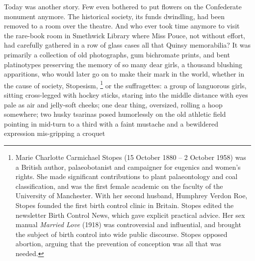   Today was another story. Few even bothered to put flowers on the Confederate
monument anymore. The historical society, its funds dwindling, had been removed
to a room over the theatre. And who ever took time anymore to visit the
rare-book room in Smethwick Library where Miss Pouce, not without effort, had
carefully gathered in a row of glass cases all that Quinsy memorabilia? It was
primarily a collection of old photographs, gum bichromate 
prints, and bent platinotypes 
preserving the memory of so many dear girls, a thousand blushing apparitions, 
who would later go on to make their mark in the world, whether in
the cause of society, Stopesism, 
\footnote{ Marie Charlotte Carmichael Stopes (15 October 1880 – 2 October
1958) was a British author, palaeobotanist and campaigner for eugenics and
women's rights. She made significant contributions to plant palaeontology and
coal classification, and was the first female academic on the faculty of the
University of Manchester.
With her second husband, Humphrey Verdon Roe, Stopes founded the first birth
control clinic in Britain. Stopes edited the newsletter Birth Control News,
which gave explicit practical advice. Her sex manual \textit{Married Love} 
(1918) was controversial and influential, and brought the subject of birth 
control into wide public discourse. Stopes opposed abortion, arguing that the 
prevention of conception was all that was needed.
}
or the suffragettes: 
a group of languorous
girls, sitting cross-legged with hockey sticks, staring into the middle distance
with eyes pale as air and jelly-soft cheeks; one dear thing, oversized, rolling
a hoop somewhere; two husky 
tsarinas 
posed humorlessly on the old athletic field pointing in mid-turn to a third 
with a faint mustache and a bewildered expression mis-gripping a croquet 
